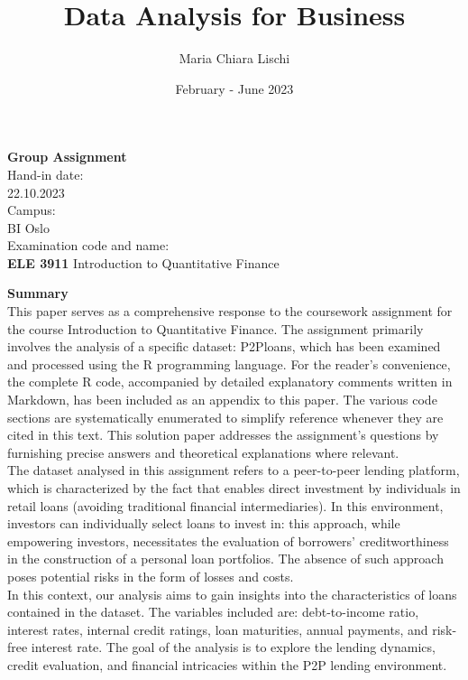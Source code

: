 \documentclass[a4paper,12pt]{article}
\title{Data Analysis for Business}
\author{Maria Chiara Lischi}
\date{February - June 2023}
\begin{document}
\begin{titlepage}
    \begin{center}
        \vspace*{1cm}
        \Huge
        \textbf {Group Assignment}\\
        \vspace{10cm}
        \LARGE
        Hand-in date:\\22.10.2023\\
        \vspace{0.5cm}
        Campus:\\BI Oslo\\
        \vspace{0.5cm}
        Examination code and name:\\\textbf{ELE 3911} Introduction to Quantitative Finance\\
        \vspace{0.8cm}
    \end{center}
\end{titlepage}

\pagebreak
\tableofcontents
\pagebreak
\textbf{\Large Summary}\\
\hfill \break
This paper serves as a comprehensive response to the coursework assignment for the course Introduction to Quantitative Finance. The assignment primarily involves the analysis of a specific dataset: P2Ploans, which has been examined and processed using the R programming language. For the reader's convenience, the complete R code, accompanied by detailed explanatory comments written in Markdown, has been included as an appendix to this paper. The various code sections are systematically enumerated to simplify reference whenever they are cited in this text. This solution paper addresses the assignment's questions by furnishing precise answers and theoretical explanations where relevant.\\
\hfill \break
The dataset analysed in this assignment refers to a peer-to-peer lending platform, which is characterized by the fact that enables direct investment by individuals in retail loans (avoiding traditional financial intermediaries). In this environment, investors can individually select loans to invest in: this approach, while empowering investors, necessitates the evaluation of borrowers' creditworthiness in the construction of a personal loan portfolios. The absence of such approach poses potential risks in the form of losses and costs.\\
In this context, our analysis aims to gain insights into the characteristics of loans contained in the dataset. The variables included are: debt-to-income ratio, interest rates, internal credit ratings, loan maturities, annual payments, and risk-free interest rate. The goal of the analysis is to explore the lending dynamics, credit evaluation, and financial intricacies within the P2P lending environment.
\end{document}
